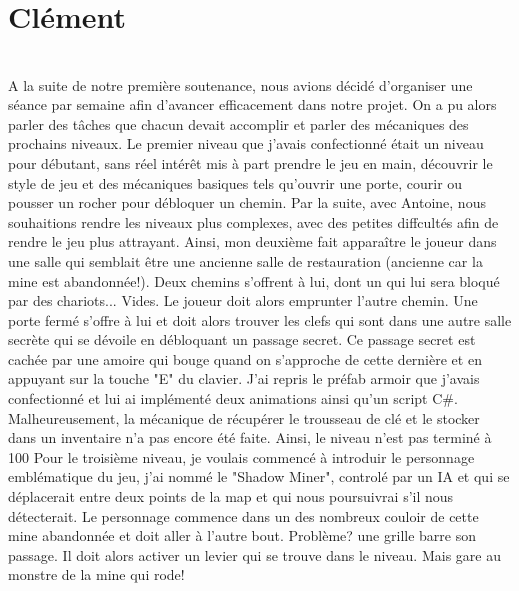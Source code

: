 \documentclass[titlepage, 13px, a4paper]{article}
\begin{document}
\newpage





\section{Clément}
\paragraph{} \hspace{0pt} \\
A la suite de notre première soutenance, nous avions décidé d'organiser une séance par semaine afin d'avancer efficacement dans notre projet.
 On a pu alors parler des tâches que chacun devait accomplir et parler des mécaniques des prochains niveaux. Le premier niveau que j'avais 
 confectionné était un niveau pour débutant, sans réel intérêt mis à part prendre le jeu en main, découvrir le style de jeu et des mécaniques 
 basiques tels qu'ouvrir une porte, courir ou pousser un rocher pour débloquer un chemin. Par la suite, avec Antoine, nous souhaitions 
 rendre les niveaux plus complexes, avec des petites diffcultés afin de rendre le jeu plus attrayant. Ainsi, mon deuxième fait 
 apparaître le joueur dans une salle qui semblait être une ancienne salle de restauration (ancienne car la mine est abandonnée!). 
 Deux chemins s'offrent à lui, dont un qui lui sera bloqué par des chariots... Vides. Le joueur doit alors emprunter l'autre chemin. 
 Une porte fermé s'offre à lui et doit alors trouver les clefs qui sont dans une autre salle secrète qui se dévoile en débloquant un 
 passage secret. Ce passage secret est cachée par une amoire qui bouge quand on s'approche de cette dernière et en appuyant sur la 
 touche "E" du clavier. J'ai repris le préfab armoir que j'avais confectionné et lui ai implémenté deux animations ainsi qu'un script C\#. 
 Malheureusement, la mécanique de récupérer le trousseau de clé et le stocker dans un inventaire n'a pas encore été faite. 
 Ainsi, le niveau n'est pas terminé à 100%
Pour le troisième niveau, je voulais commencé à introduir le personnage emblématique du jeu, j'ai nommé le "Shadow Miner",
controlé par un IA et qui se déplacerait entre deux points  de la map et qui nous poursuivrai s'il nous détecterait. 
Le personnage commence dans un des nombreux couloir de cette mine abandonnée et doit aller à l'autre bout. 
Problème? une grille barre son passage. Il doit alors activer un levier qui se trouve dans le niveau. 
Mais gare au monstre de la mine qui rode! 
\end{document}
